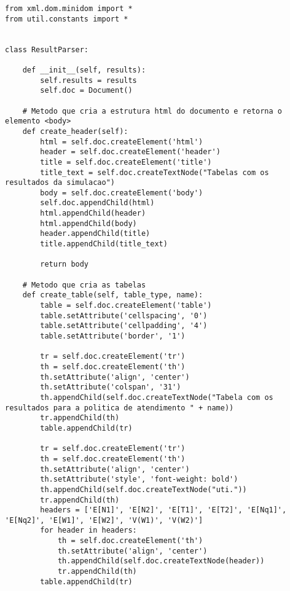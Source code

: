 \begin{lstlisting}
from xml.dom.minidom import *
from util.constants import *


class ResultParser:
    
    def __init__(self, results):
        self.results = results
        self.doc = Document()
    
    # Metodo que cria a estrutura html do documento e retorna o elemento <body>
    def create_header(self):
        html = self.doc.createElement('html')
        header = self.doc.createElement('header')
        title = self.doc.createElement('title')
        title_text = self.doc.createTextNode("Tabelas com os resultados da simulacao")
        body = self.doc.createElement('body')
        self.doc.appendChild(html)
        html.appendChild(header)
        html.appendChild(body)
        header.appendChild(title)
        title.appendChild(title_text)
        
        return body
    
    # Metodo que cria as tabelas
    def create_table(self, table_type, name):
        table = self.doc.createElement('table')
        table.setAttribute('cellspacing', '0')
        table.setAttribute('cellpadding', '4')
        table.setAttribute('border', '1')
        
        tr = self.doc.createElement('tr')
        th = self.doc.createElement('th')
        th.setAttribute('align', 'center')
        th.setAttribute('colspan', '31')
        th.appendChild(self.doc.createTextNode("Tabela com os resultados para a politica de atendimento " + name))
        tr.appendChild(th)
        table.appendChild(tr)
        
        tr = self.doc.createElement('tr')
        th = self.doc.createElement('th')
        th.setAttribute('align', 'center')
        th.setAttribute('style', 'font-weight: bold')
        th.appendChild(self.doc.createTextNode("uti."))
        tr.appendChild(th)
        headers = ['E[N1]', 'E[N2]', 'E[T1]', 'E[T2]', 'E[Nq1]', 'E[Nq2]', 'E[W1]', 'E[W2]', 'V(W1)', 'V(W2)']
        for header in headers:
            th = self.doc.createElement('th')
            th.setAttribute('align', 'center')
            th.appendChild(self.doc.createTextNode(header))
            tr.appendChild(th)
        table.appendChild(tr)
        

\end{lstlisting}
